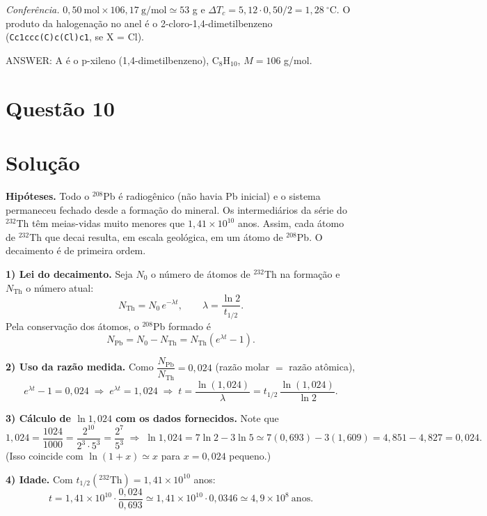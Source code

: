 \documentclass{article}%
\begin{document}
\emph{Conferência.} $0{,}50\ \text{mol}\times 106{,}17\ \text{g/mol}\simeq 53$ g e $\Delta T_c=5{,}12\cdot 0{,}50/2=1{,}28\ ^\circ\mathrm{C}$. O produto da halogenação no anel é o 2-cloro-1,4-dimetilbenzeno (\texttt{Cc1ccc(C)c(Cl)c1}, se X = Cl).

ANSWER: A é o p-xileno (1,4-dimetilbenzeno), $\mathrm{C_8H_{10}}$, $M=106$ g/mol.%
\newpage%
\section*{Questão 10}

\section*{Solução}

\textbf{Hipóteses.} Todo o $^{208}$Pb é radiogênico (não havia Pb inicial) e o sistema permaneceu fechado desde a formação do mineral. Os intermediários da série do $^{232}$Th têm meias-vidas muito menores que $1{,}41\times10^{10}$ anos. Assim, cada átomo de $^{232}$Th que decai resulta, em escala geológica, em um átomo de $^{208}$Pb. O decaimento é de primeira ordem.

\textbf{1) Lei do decaimento.} Seja $N_0$ o número de átomos de $^{232}$Th na formação e $N_{\mathrm{Th}}$ o número atual:
\[
N_{\mathrm{Th}}=N_0\,e^{-\lambda t},\qquad \lambda=\frac{\ln 2}{t_{1/2}} .
\]
Pela conservação dos átomos, o $^{208}$Pb formado é
\[
N_{\mathrm{Pb}}=N_0-N_{\mathrm{Th}}=N_{\mathrm{Th}}\left(e^{\lambda t}-1\right).
\]

\textbf{2) Uso da razão medida.} Como $\dfrac{N_{\mathrm{Pb}}}{N_{\mathrm{Th}}}=0{,}024$ (razão molar $=$ razão atômica),
\[
e^{\lambda t}-1=0{,}024\;\Rightarrow\; e^{\lambda t}=1{,}024 \;\Rightarrow\; t=\frac{\ln(1{,}024)}{\lambda}=t_{1/2}\,\frac{\ln(1{,}024)}{\ln 2}.
\]

\textbf{3) Cálculo de $\ln 1{,}024$ com os dados fornecidos.} Note que
\[
1{,}024=\frac{1024}{1000}=\frac{2^{10}}{2^{3}\cdot 5^{3}}=\frac{2^{7}}{5^{3}}
\;\Rightarrow\;
\ln 1{,}024=7\ln 2-3\ln 5\simeq 7(0{,}693)-3(1{,}609)=4{,}851-4{,}827=0{,}024 .
\]
(Isso coincide com $\ln(1+x)\simeq x$ para $x=0{,}024$ pequeno.)

\textbf{4) Idade.} Com $t_{1/2}(^{232}\mathrm{Th})=1{,}41\times10^{10}$ anos:
\[
t=1{,}41\times10^{10}\cdot\frac{0{,}024}{0{,}693}\simeq 1{,}41\times10^{10}\cdot 0{,}0346\simeq 4{,}9\times10^{8}\ \text{anos}.
\]
\end{document}
